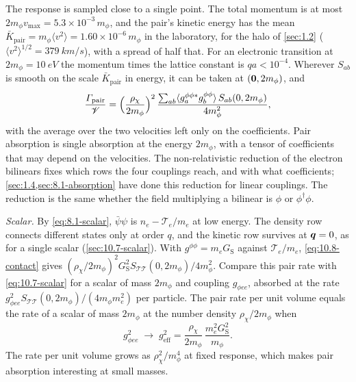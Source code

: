 The response is sampled close to a single point. The total momentum is at most $2m_\phi v_{\mathrm{max}} = 5.3\times10^{-3}\,m_\phi$, and the pair's kinetic energy has the mean $\bar K_{\mathrm{pair}} = m_\phi\langle v^2\rangle = 1.60\times10^{-6}\,m_\phi$ in the laboratory, for the halo of \cref{sec:1.2} ($\langle v^2\rangle^{1/2} = \SI{379}{km/s}$), with a spread of half that. For an electronic transition at $2m_\phi = \SI{10}{eV}$ the momentum times the lattice constant is $qa < 10^{-4}$. Wherever $S_{ab}$ is smooth on the scale $\bar K_{\mathrm{pair}}$ in energy, it can be taken at $(\bm{0}, 2m_\phi)$, and
\begin{equation}
  \frac{\varGamma_{\mathrm{pair}}}{\mathscr{V}} = \Bigl(\frac{\rho_\chi}{2m_\phi}\Bigr)^2\,\frac{\sum_{ab}\langle g^{\phi\phi*}_a g^{\phi\phi}_b\rangle\,S_{ab}(0, 2m_\phi)}{4m_\phi^2} ,
  \label{eq:10.8-contact}
\end{equation}
with the average over the two velocities left only on the coefficients. Pair absorption is single absorption at the energy $2m_\phi$, with a tensor of coefficients that may depend on the velocities. The non-relativistic reduction of the electron bilinears fixes which rows the four couplings reach, and with what coefficients; \cref{sec:1.4,sec:8.1-absorption} have done this reduction for linear couplings. The reduction is the same whether the field multiplying a bilinear is $\phi$ or $\phi^\dagger\phi$.

\emph{Scalar.} By \cref{eq:8.1-scalar}, $\bar\psi\psi$ is $n_e - \mathcal{T}_e/m_e$ at low energy. The density row connects different states only at order $q$, and the kinetic row survives at $\bm{q} = 0$, as for a single scalar (\cref{sec:10.7-scalar}). With $g^{\phi\phi} = m_eG_{\mathrm{S}}$ against $\mathcal{T}_e/m_e$, \cref{eq:10.8-contact} gives $(\rho_\chi/2m_\phi)^2G_{\mathrm{S}}^2S_{\mathcal{T}\mathcal{T}}(0, 2m_\phi)/4m_\phi^2$. Compare this pair rate with \cref{eq:10.7-scalar} for a scalar of mass $2m_\phi$ and coupling $g_{\phi ee}$, absorbed at the rate $g_{\phi ee}^2S_{\mathcal{T}\mathcal{T}}(0, 2m_\phi)/(4m_\phi m_e^2)$ per particle. The pair rate per unit volume equals the rate of a scalar of mass $2m_\phi$ at the number density $\rho_\chi/2m_\phi$ when
\begin{equation}
  g_{\phi ee}^2 \;\to\; g_{\mathrm{eff}}^2 = \frac{\rho_\chi}{2m_\phi}\,\frac{m_e^2G_{\mathrm{S}}^2}{m_\phi} .
  \label{eq:10.8-geff}
\end{equation}
The rate per unit volume grows as $\rho_\chi^2/m_\phi^4$ at fixed response, which makes pair absorption interesting at small masses.

